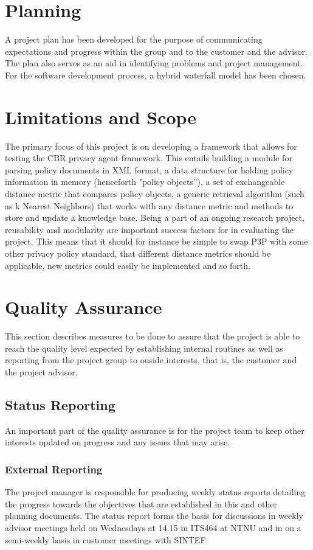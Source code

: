 \section{Planning}
A project plan has been developed for the purpose of communicating expectations and progress within the group and to the customer and the advisor. The plan also serves as an aid in identifying problems and project management. For the software development process, a hybrid waterfall model has been chosen.


\section{Limitations and Scope}
The primary focus of this project is on developing a framework that allows for testing the CBR privacy agent framework. This entails building a module for parsing policy documents in XML format, a data structure for holding policy information in memory (henceforth "policy objects''), a set of exchangeable distance metric that compares policy objects, a generic retrieval algorithm (such as k Nearest Neighbors) that works with any distance metric and methods to store and update a knowledge base. Being a part of an ongoing research project, reusability and modularity are important success factors for in evaluating the project. This means that it should for instance be simple to swap P3P with some other privacy policy standard, that different distance metrics should be applicable, new metrics could easily be implemented and so forth.


\section{Quality Assurance}

This section describes measures to be done to assure that the project is able to reach the quality level expected by establishing internal routines as well as reporting from the project group to ouside interests, that is, the customer and the project advisor.

\subsection{Status Reporting}

An important part of the quality assurance is for the project team to keep other interests updated on progress and any issues that may arise.

\subsubsection{External Reporting}
The project manager is responsible for producing weekly status reports detailing the progress towards the objectives that are established in this and other planning documents. The status report forms the basis for discussions in weekly advisor meetings held on Wednesdays at 14.15 in ITS464 at NTNU and in on a semi-weekly basis in customer meetings with SINTEF.

